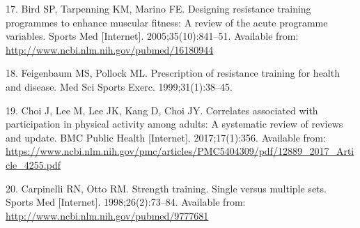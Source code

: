 \documentclass[twoside,10pt]{gihclass} %
\begin{document}
\leavevmode\hypertarget{ref-RN798}{}%
17. Bird SP, Tarpenning KM, Marino FE. Designing resistance training programmes to enhance muscular fitness: A review of the acute programme variables. Sports Med {[}Internet{]}. 2005;35(10):841--51. Available from: \url{http://www.ncbi.nlm.nih.gov/pubmed/16180944}

\leavevmode\hypertarget{ref-RN2538}{}%
18. Feigenbaum MS, Pollock ML. Prescription of resistance training for health and disease. Med Sci Sports Exerc. 1999;31(1):38--45.

\leavevmode\hypertarget{ref-RN2063}{}%
19. Choi J, Lee M, Lee JK, Kang D, Choi JY. Correlates associated with participation in physical activity among adults: A systematic review of reviews and update. BMC Public Health {[}Internet{]}. 2017;17(1):356. Available from: \url{https://www.ncbi.nlm.nih.gov/pmc/articles/PMC5404309/pdf/12889_2017_Article_4255.pdf}

\leavevmode\hypertarget{ref-RN794}{}%
20. Carpinelli RN, Otto RM. Strength training. Single versus multiple sets. Sports Med {[}Internet{]}. 1998;26(2):73--84. Available from: \url{http://www.ncbi.nlm.nih.gov/pubmed/9777681}


\end{document}
